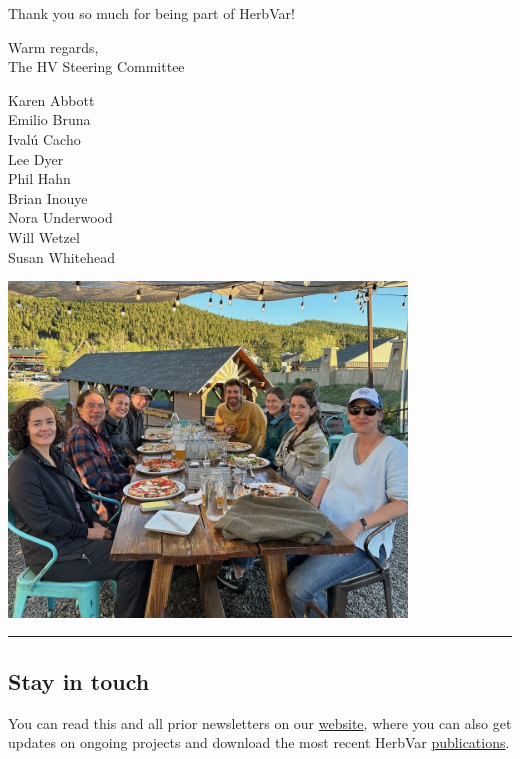 \documentclass[
  12pt,
]{article}
\begin{document}
Thank you so much for being part of HerbVar!

Warm regards,\\
The HV Steering Committee

Karen Abbott\\
Emilio Bruna\\
Ivalú Cacho\\
Lee Dyer\\
Phil Hahn\\
Brian Inouye\\
Nora Underwood\\
Will Wetzel\\
Susan Whitehead

\includegraphics[width=4.16667in,height=\textheight]{images_2025-01/IMG_3994.jpeg}

\begin{center}\rule{0.5\linewidth}{0.5pt}\end{center}

\subsection{Stay in touch}\label{stay-in-touch}

You can read this and all prior newsletters on our
\href{https://herbvar.org/}{website}, where you can also get updates on
ongoing projects and download the most recent HerbVar
\href{https://herbvar.org/products.html}{publications}.
\end{document}
